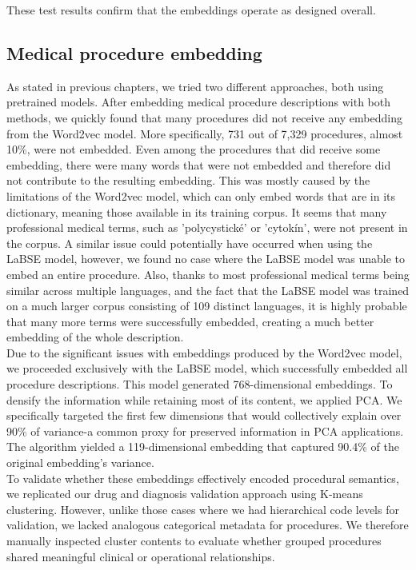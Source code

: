 These test results confirm that the embeddings operate as designed overall.

\subsection{Medical procedure embedding}

As stated in previous chapters, we tried two different approaches, both using pretrained models. After embedding medical procedure descriptions with both methods, we quickly found that many procedures did not receive any embedding from the Word2vec model. More specifically, 731 out of 7,329 procedures, almost 10\%, were not embedded. Even among the procedures that did receive some embedding, there were many words that were not embedded and therefore did not contribute to the resulting embedding. This was mostly caused by the limitations of the Word2vec model, which can only embed words that are in its dictionary, meaning those available in its training corpus. It seems that many professional medical terms, such as 'polycystické' or 'cytokín', were not present in the corpus. A similar issue could potentially have occurred when using the LaBSE model, however, we found no case where the LaBSE model was unable to embed an entire procedure. Also, thanks to most professional medical terms being similar across multiple languages, and the fact that the LaBSE model was trained on a much larger corpus consisting of 109 distinct languages, it is highly probable that many more terms were successfully embedded, creating a much better embedding of the whole description.
\\

Due to the significant issues with embeddings produced by the Word2vec model, we proceeded exclusively with the LaBSE model, which successfully embedded all procedure descriptions. This model generated 768-dimensional embeddings. To densify the information while retaining most of its content, we applied PCA. We specifically targeted the first few dimensions that would collectively explain over 90\% of variance-a common proxy for preserved information in PCA applications. The algorithm yielded a 119-dimensional embedding that captured 90.4\% of the original embedding's variance.
\\

To validate whether these embeddings effectively encoded procedural semantics, we replicated our drug and diagnosis validation approach using K-means clustering. However, unlike those cases where we had hierarchical code levels for validation, we lacked analogous categorical metadata for procedures. We therefore manually inspected cluster contents to evaluate whether grouped procedures shared meaningful clinical or operational relationships.
\\

